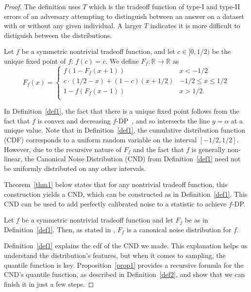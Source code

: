 \documentclass{article}
\begin{document}
\begin{proof}
The definition uses $T$ which is the tradeoff function of type-I and type-II errors of an adversary attempting to distinguish 
between an answer on a dataset with or without any given individual. 
A larger $T$ indicates it is more difficult to distiguish between the distributions.

\begin{definition}
    \label{def1}  %
    Let $f$ be a symmetric nontrivial tradeoff function, and let {$c\in [0,1/2)$} be the unique fixed point of $f$: $f(c)=c$. 
    We define $F_f:\mathbb{R}\rightarrow \mathbb{R}$ as  \[ F_f(x) = \begin{cases}
        f(1-F_f(x+1))&x<-1/2\\
        c \cdot (1/2-x) + (1-c)(x+1/2)&-1/2\leq x\leq 1/2\\
        1-f(F_f(x-1))&x>1/2.\\
    \end{cases}\]
\end{definition}
In Definition~\ref{def1}, 
the fact that there is a unique fixed point follows from the fact that $f$ is convex and decreasing $f$-DP~\parencite{dong2019gaussian}, 
and so intersects the line $y=\alpha$ at a unique value. 
Note that in Definition~\ref{def1}, 
the cumulative distribution function (CDF) corresponds to a uniform random variable on the interval $[-1/2,1/2]$. 
However, due to the recursive nature of $F_f$ and the fact that $f$ is generally non-linear, 
the Canonical Noise Distribution (CND) from Definition~\ref{def1} need not be uniformly distributed on any other intervals.

Theorem~\ref{thm1} below states that for any nontrivial tradeoff function, 
this construction yields a CND, which can be constructed as in Definition~\ref{def1}. 
This CND can be used to add perfectly calibrated noise to a statistic to achieve $f$-DP. 

\begin{theorem}
    \label{thm1}
    Let $f$ be a symmetric nontrivial tradeoff function and let $F_f$ be as in Definition~\ref{def1}. 
    Then, as stated in \parencite[Theorem~3.9]{awan2023canonical}, $F_f$ is a canonical noise distribution for $f$. 
\end{theorem}

Definition~\ref{def1} explains the cdf of the CND we made. 
This explanation helps us understand the distribution's features, but when it comes to sampling, the quantile function is key. 
Proposition~\ref{prop1} provides a recursive formula for the CND's quantile function,
as described in Definition~\ref{def2}, and show that we can finish it in just a few steps.


\end{proof}
\end{document}
